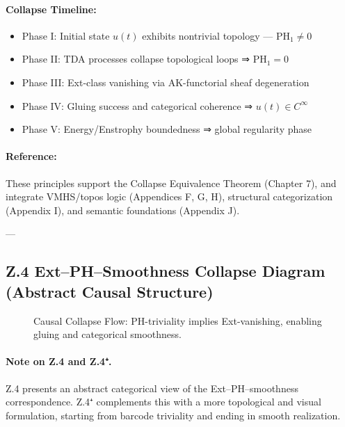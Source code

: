 \documentclass[11pt]{article}
\DeclareMathOperator{\colim}{colim}
\begin{document}
\begin{axiom}
\begin{axiom}
{{\paragraph{Collapse Timeline:}
\begin{itemize}
  \item Phase I: Initial state \( u(t) \) exhibits nontrivial topology — PH\(_1 \ne 0\)
  \item Phase II: TDA processes collapse topological loops ⇒ \( \mathrm{PH}_1 = 0 \)
  \item Phase III: Ext-class vanishing via AK-functorial sheaf degeneration
  \item Phase IV: Gluing success and categorical coherence ⇒ \( u(t) \in C^\infty \)
  \item Phase V: Energy/Enstrophy boundedness ⇒ global regularity phase
\end{itemize}

\paragraph{Reference:}
These principles support the Collapse Equivalence Theorem (Chapter 7),  
and integrate VMHS/topos logic (Appendices F, G, H), structural categorization (Appendix I),  
and semantic foundations (Appendix J).


---

\subsection*{Z.4 Ext–PH–Smoothness Collapse Diagram (Abstract Causal Structure)}

\begin{figure}[H]
\centering
{}
\caption{Causal Collapse Flow: PH-triviality implies Ext-vanishing, enabling gluing and categorical smoothness.}
\end{figure}

\paragraph{Note on Z.4 and Z.4⁺.}  
Z.4 presents an abstract categorical view of the Ext–PH–smoothness correspondence.  
Z.4⁺ complements this with a more topological and visual formulation, starting from barcode triviality and ending in smooth realization.

}}
\end{axiom}
\end{axiom}
\end{document}
